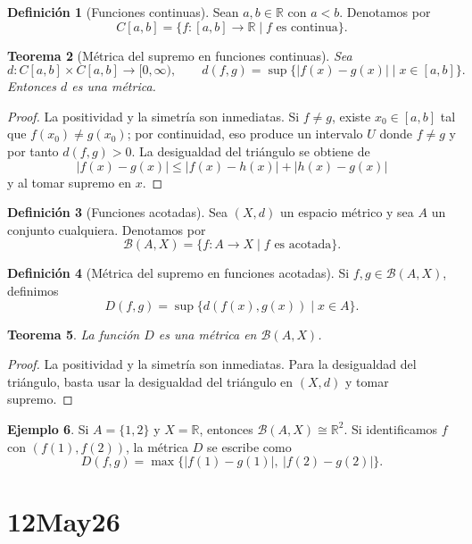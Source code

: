 \documentclass[12pt]{article}
\theoremstyle{definition}
\newtheorem{definition}{Definición}[section]
\newtheorem{example}[definition]{Ejemplo}
\theoremstyle{plain}
\newtheorem{theorem}[definition]{Teorema}
\theoremstyle{remark}
\begin{document}
\begin{definition}[Funciones continuas]
Sean $a,b\in\mathbb R$ con $a<b$.
Denotamos por
\[
C[a,b]=\{f:[a,b]\to\mathbb R\mid f \text{ es continua}\}.
\]
\end{definition}

\begin{theorem}[Métrica del supremo en funciones continuas]
Sea
\[
d\colon C[a,b]\times C[a,b]\to[0,\infty),\qquad
d(f,g)=\sup\{|f(x)-g(x)|\mid x\in[a,b]\}.
\]
Entonces $d$ es una métrica.
\end{theorem}

\begin{proof}
La positividad y la simetría son inmediatas.
Si $f\neq g$, existe $x_0\in[a,b]$ tal que $f(x_0)\neq g(x_0)$; por continuidad, eso produce un intervalo $U$ donde $f\neq g$ y por tanto $d(f,g)>0$.
La desigualdad del triángulo se obtiene de
\[
|f(x)-g(x)|\le |f(x)-h(x)|+|h(x)-g(x)|
\]
y al tomar supremo en $x$.
\end{proof}

\begin{definition}[Funciones acotadas]
Sea $(X,d)$ un espacio métrico y sea $A$ un conjunto cualquiera.
Denotamos por
\[
\mathcal B(A,X)=\{f\colon A\to X\mid f \text{ es acotada}\}.
\]
\end{definition}

\begin{definition}[Métrica del supremo en funciones acotadas]
Si $f,g\in\mathcal B(A,X)$, definimos
\[
D(f,g)=\sup\{d(f(x),g(x))\mid x\in A\}.
\]
\end{definition}

\begin{theorem}
La función $D$ es una métrica en $\mathcal B(A,X)$.
\end{theorem}

\begin{proof}
La positividad y la simetría son inmediatas.
Para la desigualdad del triángulo, basta usar la desigualdad del triángulo en $(X,d)$ y tomar supremo.
\end{proof}

\begin{example}
Si $A=\{1,2\}$ y $X=\mathbb R$, entonces $\mathcal B(A,X)\cong\mathbb R^2$.
Si identificamos $f$ con $(f(1),f(2))$, la métrica $D$ se escribe como
\[
D(f,g)=\max\{|f(1)-g(1)|,\ |f(2)-g(2)|\}.
\]
\end{example}

\section*{12May26}
\end{document}
